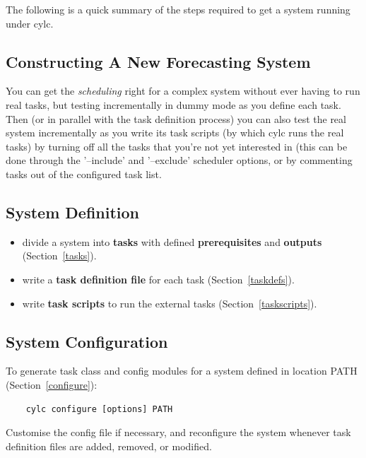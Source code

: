 \documentclass[11pt,a4paper]{article}
\begin{document}
The following is a quick summary of the steps required to get a system
running under cylc. 

\subsection{Constructing A New Forecasting System}

You can get the {\em scheduling} right for a complex system without ever
having to run real tasks, but testing incrementally in dummy mode as you
define each task. Then (or in parallel with the task definition process)
you can also test the real system incrementally as you write its task
scripts (by which cylc runs the real tasks) by turning off all the
tasks that you're not yet interested in (this can be done through the
'--include' and '--exclude' scheduler options, or by commenting tasks
out of the configured task list.

\pagebreak
\subsection{System Definition} 

\begin{itemize}
    \item divide a system into {\bf tasks} with defined {\bf
        prerequisites} and {\bf outputs} (Section~\ref{tasks}).

    \item write a {\bf task definition file} for each task
        (Section~\ref{taskdefs}).

    \item write {\bf task scripts} to run the external tasks
        (Section~\ref{taskscripts}).
\end{itemize}

\subsection{System Configuration}
\label{QuickSystemConfiguration}

To generate task class and config modules for a system defined in
location PATH (Section~\ref{configure}): 

\begin{lstlisting}
    cylc configure [options] PATH
\end{lstlisting}

Customise the config file if necessary, and reconfigure the system
whenever task definition files are added, removed, or modified.
\end{document}
